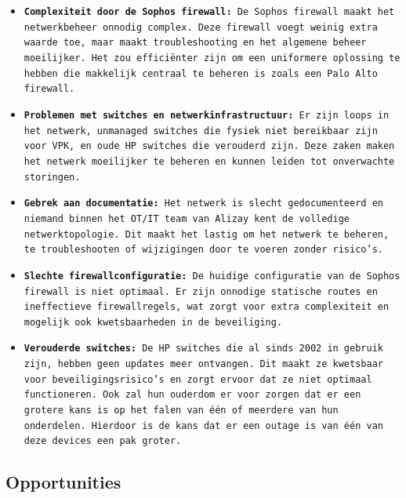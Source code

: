\begin{itemize}
\item \texttt{\textbf{Complexiteit door de Sophos firewall:} De Sophos firewall maakt het netwerkbeheer onnodig complex. Deze firewall voegt weinig extra waarde toe, maar maakt troubleshooting en het algemene beheer moeilijker. Het zou efficiënter zijn om een uniformere oplossing te hebben die makkelijk centraal te beheren is zoals een Palo Alto firewall.}

\item \texttt{\textbf{Problemen met switches en netwerkinfrastructuur:} Er zijn loops in het netwerk, unmanaged switches die fysiek niet bereikbaar zijn voor VPK, en oude HP switches die verouderd zijn. Deze zaken maken het netwerk moeilijker te beheren en kunnen leiden tot onverwachte storingen.}

\item \texttt{\textbf{Gebrek aan documentatie:} Het netwerk is slecht gedocumenteerd en niemand binnen het OT/IT team van Alizay kent de volledige netwerktopologie. Dit maakt het lastig om het netwerk te beheren, te troubleshooten of wijzigingen door te voeren zonder risico’s.}

\item \texttt{\textbf{Slechte firewallconfiguratie:} De huidige configuratie van de Sophos firewall is niet optimaal. Er zijn onnodige statische routes en ineffectieve firewallregels, wat zorgt voor extra complexiteit en mogelijk ook kwetsbaarheden in de beveiliging.}

\item \texttt{\textbf{Verouderde switches:} De HP switches die al sinds 2002 in gebruik zijn, hebben geen updates meer ontvangen. Dit maakt ze kwetsbaar voor beveiligingsrisico’s en zorgt ervoor dat ze niet optimaal functioneren. Ook zal hun ouderdom er voor zorgen dat er een grotere kans is op het falen van één of meerdere van hun onderdelen. Hierdoor is de kans dat er een outage is van één van deze devices een pak groter. }
\end{itemize}
    
\subsection{Opportunities}

